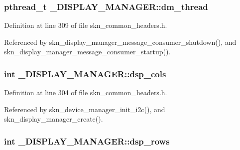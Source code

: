 \subsubsection[{\texorpdfstring{dm\+\_\+thread}{dm_thread}}]{\setlength{\rightskip}{0pt plus 5cm}pthread\+\_\+t \+\_\+\+D\+I\+S\+P\+L\+A\+Y\+\_\+\+M\+A\+N\+A\+G\+E\+R\+::dm\+\_\+thread}\hypertarget{struct___d_i_s_p_l_a_y___m_a_n_a_g_e_r_a7033f795cd887063d36c11556c368e6f}{}\label{struct___d_i_s_p_l_a_y___m_a_n_a_g_e_r_a7033f795cd887063d36c11556c368e6f}


Definition at line 309 of file skn\+\_\+common\+\_\+headers.\+h.



Referenced by skn\+\_\+display\+\_\+manager\+\_\+message\+\_\+consumer\+\_\+shutdown(), and skn\+\_\+display\+\_\+manager\+\_\+message\+\_\+consumer\+\_\+startup().

\subsubsection[{\texorpdfstring{dsp\+\_\+cols}{dsp_cols}}]{\setlength{\rightskip}{0pt plus 5cm}int \+\_\+\+D\+I\+S\+P\+L\+A\+Y\+\_\+\+M\+A\+N\+A\+G\+E\+R\+::dsp\+\_\+cols}\hypertarget{struct___d_i_s_p_l_a_y___m_a_n_a_g_e_r_a8ea0b9503de7da47f210489c8fa19867}{}\label{struct___d_i_s_p_l_a_y___m_a_n_a_g_e_r_a8ea0b9503de7da47f210489c8fa19867}


Definition at line 304 of file skn\+\_\+common\+\_\+headers.\+h.



Referenced by skn\+\_\+device\+\_\+manager\+\_\+init\+\_\+i2c(), and skn\+\_\+display\+\_\+manager\+\_\+create().

\subsubsection[{\texorpdfstring{dsp\+\_\+rows}{dsp_rows}}]{\setlength{\rightskip}{0pt plus 5cm}int \+\_\+\+D\+I\+S\+P\+L\+A\+Y\+\_\+\+M\+A\+N\+A\+G\+E\+R\+::dsp\+\_\+rows}\hypertarget{struct___d_i_s_p_l_a_y___m_a_n_a_g_e_r_aeddcffcc90a611efde00a085352bc63b}{}\label{struct___d_i_s_p_l_a_y___m_a_n_a_g_e_r_aeddcffcc90a611efde00a085352bc63b}


